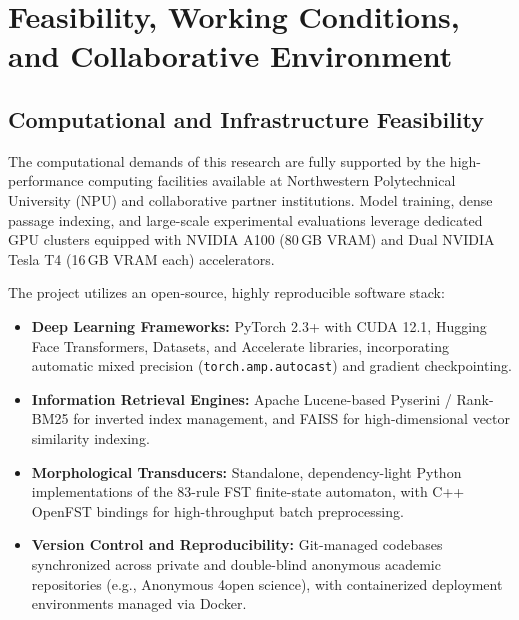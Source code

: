 \section{Feasibility, Working Conditions, and Collaborative Environment}
\label{sec:feasibility}

\subsection{Computational and Infrastructure Feasibility}
The computational demands of this research are fully supported by the high-performance computing facilities available at Northwestern Polytechnical University (NPU) and collaborative partner institutions. Model training, dense passage indexing, and large-scale experimental evaluations leverage dedicated GPU clusters equipped with NVIDIA A100 (80\,GB VRAM) and Dual NVIDIA Tesla T4 (16\,GB VRAM each) accelerators.

The project utilizes an open-source, highly reproducible software stack:
\begin{itemize}[leftmargin=*, nosep]
    \item \textbf{Deep Learning Frameworks:} PyTorch 2.3+ with CUDA 12.1, Hugging Face Transformers, Datasets, and Accelerate libraries, incorporating automatic mixed precision (\texttt{torch.amp.autocast}) and gradient checkpointing.
    \item \textbf{Information Retrieval Engines:} Apache Lucene-based Pyserini / Rank-BM25 for inverted index management, and FAISS for high-dimensional vector similarity indexing.
    \item \textbf{Morphological Transducers:} Standalone, dependency-light Python implementations of the 83-rule FST finite-state automaton, with C++ OpenFST bindings for high-throughput batch preprocessing.
    \item \textbf{Version Control and Reproducibility:} Git-managed codebases synchronized across private and double-blind anonymous academic repositories (e.g., Anonymous 4open science), with containerized deployment environments managed via Docker.
\end{itemize}

